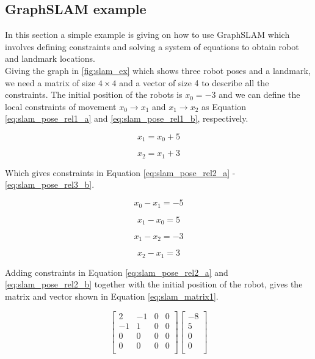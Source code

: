 \subsection{GraphSLAM example}

In this section a simple example is giving on how to use GraphSLAM which involves defining constraints and solving a system of equations to obtain robot and landmark locations.\\

Giving the graph in \autoref{fig:slam_ex} which shows three robot poses and a landmark, we need a matrix of size $4\times4$ and a vector of size 4 to describe all the constraints. The initial position of the robots is $x_0 = -3$ and we can define the local constraints of movement $x_0 \rightarrow x_1$ and $x_1 \rightarrow x_2$ as Equation \ref{eq:slam_pose_rel1_a} and \ref{eq:slam_pose_rel1_b}, respectively.

\begin{equation}
\label{eq:slam_pose_rel1_a}
x_1 = x_0 + 5
\end{equation}

\begin{equation}
\label{eq:slam_pose_rel1_b}
x_2 = x_1 + 3
\end{equation}

Which gives constraints in Equation \ref{eq:slam_pose_rel2_a} - \ref{eq:slam_pose_rel3_b}.

\begin{equation}
\label{eq:slam_pose_rel2_a}
x_0 - x_1 = -5
\end{equation}

\begin{equation}
\label{eq:slam_pose_rel2_b}
x_1 - x_0 = 5
\end{equation}

\begin{equation}
\label{eq:slam_pose_rel3_a}
x_1 - x_2 = -3
\end{equation}

\begin{equation}
\label{eq:slam_pose_rel3_b}
x_2 - x_1 = 3
\end{equation}

Adding constraints in Equation \ref{eq:slam_pose_rel2_a} and \ref{eq:slam_pose_rel2_b} together with the initial position of the robot, gives the matrix and vector shown in Equation \ref{eq:slam_matrix1}.

\begin{equation}
\label{eq:slam_matrix1}
\begin{bmatrix}
2 & -1 & 0 & 0 \\
-1 & 1 & 0 & 0 \\
0 & 0 & 0 & 0 \\
0 & 0 & 0 & 0 \\
\end{bmatrix}
\begin{bmatrix}
-8 \\
5 \\
0 \\
0 \\
\end{bmatrix}
\end{equation}

